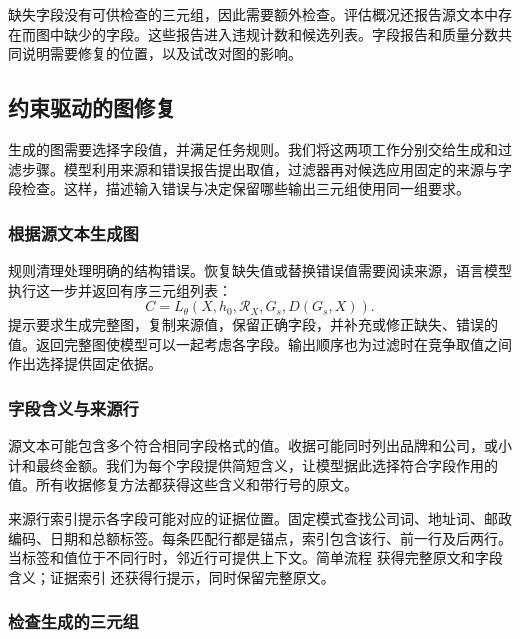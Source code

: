 缺失字段没有可供检查的三元组，因此需要额外检查。评估概况还报告源文本中存在而图中缺少的字段。这些报告进入违规计数和候选列表。字段报告和质量分数共同说明需要修复的位置，以及试改对图的影响。

\subsection{约束驱动的图修复}

生成的图需要选择字段值，并满足任务规则。我们将这两项工作分别交给生成和过滤步骤。模型利用来源和错误报告提出取值，过滤器再对候选应用固定的来源与字段检查。这样，描述输入错误与决定保留哪些输出三元组使用同一组要求。

\subsubsection{根据源文本生成图}
\label{sec:framework:architecture}

规则清理处理明确的结构错误。恢复缺失值或替换错误值需要阅读来源，语言模型执行这一步并返回有序三元组列表：
\begin{equation}
    \label{eq:proposal_generation}
    C=L_\theta(X,h_0,\mathcal R_X,G_s,D(G_s,X)).
\end{equation}
提示要求生成完整图，复制来源值，保留正确字段，并补充或修正缺失、错误的值。返回完整图使模型可以一起考虑各字段。输出顺序也为过滤时在竞争取值之间作出选择提供固定依据。

\subsubsection{字段含义与来源行}
\label{sec:framework:field_evidence}

源文本可能包含多个符合相同字段格式的值。收据可能同时列出品牌和公司，或小计和最终金额。我们为每个字段提供简短含义，让模型据此选择符合字段作用的值。所有收据修复方法都获得这些含义和带行号的原文。

来源行索引提示各字段可能对应的证据位置。固定模式查找公司词、地址词、邮政编码、日期和总额标签。每条匹配行都是锚点，索引包含该行、前一行及后两行。当标签和值位于不同行时，邻近行可提供上下文。简单流程 获得完整原文和字段含义；证据索引 还获得行提示，同时保留完整原文。

\subsubsection{检查生成的三元组}
\label{sec:framework:constraints}

